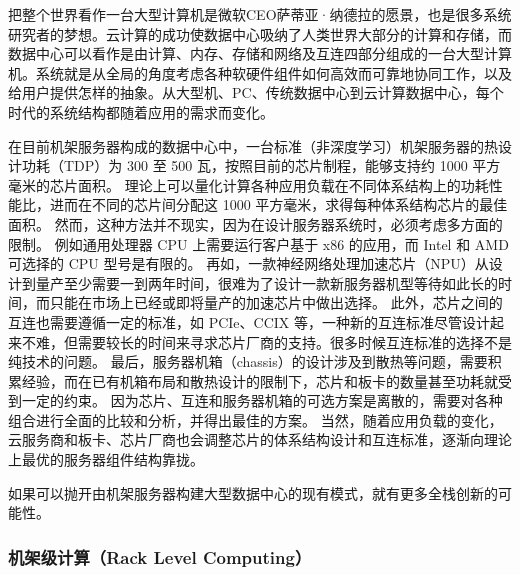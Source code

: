 把整个世界看作一台大型计算机是微软CEO萨蒂亚·纳德拉的愿景，也是很多系统研究者的梦想。云计算的成功使数据中心吸纳了人类世界大部分的计算和存储，而数据中心可以看作是由计算、内存、存储和网络及互连四部分组成的一台大型计算机。系统就是从全局的角度考虑各种软硬件组件如何高效而可靠地协同工作，以及给用户提供怎样的抽象。从大型机、PC、传统数据中心到云计算数据中心，每个时代的系统结构都随着应用的需求而变化。

在目前机架服务器构成的数据中心中，一台标准（非深度学习）机架服务器的热设计功耗（TDP）为 300 至 500 瓦，按照目前的芯片制程，能够支持约 1000 平方毫米的芯片面积。
理论上可以量化计算各种应用负载在不同体系结构上的功耗性能比，进而在不同的芯片间分配这 1000 平方毫米，求得每种体系结构芯片的最佳面积。
然而，这种方法并不现实，因为在设计服务器系统时，必须考虑多方面的限制。
例如通用处理器 CPU 上需要运行客户基于 x86 的应用，而 Intel 和 AMD 可选择的 CPU 型号是有限的。
再如，一款神经网络处理加速芯片（NPU）从设计到量产至少需要一到两年时间，很难为了设计一款新服务器机型等待如此长的时间，而只能在市场上已经或即将量产的加速芯片中做出选择。
此外，芯片之间的互连也需要遵循一定的标准，如 PCIe、CCIX 等，一种新的互连标准尽管设计起来不难，但需要较长的时间来寻求芯片厂商的支持。很多时候互连标准的选择不是纯技术的问题。
最后，服务器机箱（chassis）的设计涉及到散热等问题，需要积累经验，而在已有机箱布局和散热设计的限制下，芯片和板卡的数量甚至功耗就受到一定的约束。
因为芯片、互连和服务器机箱的可选方案是离散的，需要对各种组合进行全面的比较和分析，并得出最佳的方案。
当然，随着应用负载的变化，云服务商和板卡、芯片厂商也会调整芯片的体系结构设计和互连标准，逐渐向理论上最优的服务器组件结构靠拢。

如果可以抛开由机架服务器构建大型数据中心的现有模式，就有更多全栈创新的可能性。

\subsubsection{机架级计算（Rack Level Computing）}

